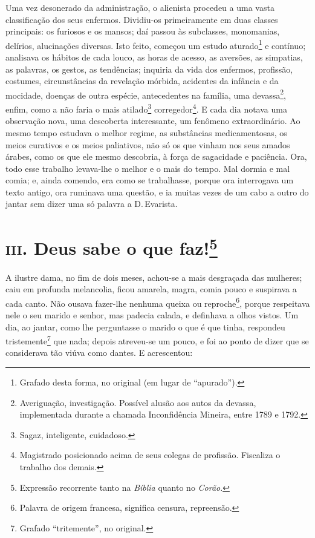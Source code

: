 Uma vez desonerado da administração, o alienista procedeu a uma vasta
classificação dos seus enfermos. Dividiu-os primeiramente em duas
classes principais: os furiosos e os mansos; daí passou às subclasses,
monomanias, delírios, alucinações diversas. Isto feito, começou um
estudo aturado\footnote{Grafado desta forma, no original (em lugar de
  ``apurado'').} e contínuo; analisava os hábitos de cada louco, as
horas de acesso, as aversões, as simpatias, as palavras, os gestos, as
tendências; inquiria da vida dos enfermos, profissão, costumes,
circunstâncias da revelação mórbida, acidentes da infância e da
mocidade, doenças de outra espécie, antecedentes na família, uma
devassa\footnote{Averiguação, investigação. Possível alusão aos autos da
  devassa, implementada durante a chamada Inconfidência Mineira, entre
  1789 e 1792.}, enfim, como a não faria o mais atilado\footnote{Sagaz,
  inteligente, cuidadoso.} corregedor\footnote{Magistrado posicionado
  acima de seus colegas de profissão. Fiscaliza o trabalho dos demais.}.
E cada dia notava uma observação nova, uma descoberta interessante, um
fenômeno extraordinário. Ao mesmo tempo estudava o melhor regime, as
substâncias medicamentosas, os meios curativos e os meios paliativos,
não só os que vinham nos seus amados árabes, como os que ele mesmo
descobria, à força de sagacidade e paciência. Ora, todo esse trabalho
levava-lhe o melhor e o mais do tempo. Mal dormia e mal comia; e, ainda
comendo, era como se trabalhasse, porque ora interrogava um texto
antigo, ora ruminava uma questão, e ia muitas vezes de um cabo a outro
do jantar sem dizer uma só palavra a D.\,Evarista.

\chapter{\textsc{iii}. Deus sabe o que faz!\footnote{Expressão recorrente tanto na
  \emph{Bíblia} quanto no \emph{Corão}.}}

A ilustre dama, no fim de dois meses, achou-se a mais desgraçada das
mulheres; caiu em profunda melancolia, ficou amarela, magra, comia pouco
e suspirava a cada canto. Não ousava fazer-lhe nenhuma queixa ou
reproche\footnote{Palavra de origem francesa, significa censura,
  repreensão.}, porque respeitava nele o seu marido e senhor, mas
padecia calada, e definhava a olhos vistos. Um dia, ao jantar, como lhe
perguntasse o marido o que é que tinha, respondeu tristemente\footnote{Grafado
  ``tritemente'', no original.} que nada; depois atreveu-se um pouco, e
foi ao ponto de dizer que se considerava tão viúva como dantes. E
acrescentou:

